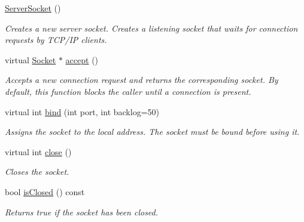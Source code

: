\begin{DoxyCompactItemize}
\item 
\mbox{\label{classcppu_1_1_server_socket_a57138f5a7d2e8af35228c8985385c494}} 
\mbox{\hyperlink{classcppu_1_1_server_socket_a57138f5a7d2e8af35228c8985385c494}{Server\+Socket}} ()
\begin{DoxyCompactList}\small\item\em Creates a new server socket. Creates a listening socket that waits for connection requests by T\+C\+P/\+IP clients. \end{DoxyCompactList}\item 
virtual \mbox{\hyperlink{classcppu_1_1_socket}{Socket}} $\ast$ \mbox{\hyperlink{classcppu_1_1_server_socket_af08ebcb886fc778d195fb622f7b96b8b}{accept}} ()
\begin{DoxyCompactList}\small\item\em Accepts a new connection request and returns the corresponding socket. By default, this function blocks the caller until a connection is present. \end{DoxyCompactList}\item 
virtual int \mbox{\hyperlink{classcppu_1_1_server_socket_a255dfdccba51c7cdbcb6733c6c3f6ffa}{bind}} (int port, int backlog=50)
\begin{DoxyCompactList}\small\item\em Assigns the socket to the local address. The socket must be bound before using it. \end{DoxyCompactList}\item 
\mbox{\label{classcppu_1_1_server_socket_ae7647cfb5beaf504a846f6ecfdd197c4}} 
virtual int \mbox{\hyperlink{classcppu_1_1_server_socket_ae7647cfb5beaf504a846f6ecfdd197c4}{close}} ()
\begin{DoxyCompactList}\small\item\em Closes the socket. \end{DoxyCompactList}\item 
\mbox{\label{classcppu_1_1_server_socket_a9e64d9443686fcfdce6b2c4386597e3b}} 
bool \mbox{\hyperlink{classcppu_1_1_server_socket_a9e64d9443686fcfdce6b2c4386597e3b}{is\+Closed}} () const
\begin{DoxyCompactList}\small\item\em Returns true if the socket has been closed. \end{DoxyCompactList}\item 

\end{DoxyCompactItemize}
